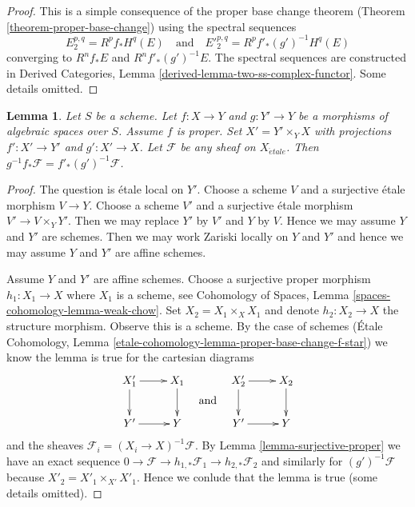 \documentclass{stacks-project}
\theoremstyle{plain}
\newtheorem{lemma}[subsection]{Lemma}
\theoremstyle{definition}
\theoremstyle{remark}
\numberwithin{equation}{subsection}
\def\etale{{\acute{e}tale}}
\begin{document}
\begin{proof}
This is a simple consequence of the proper base change theorem
(Theorem \ref{theorem-proper-base-change}) using the spectral
sequences
$$
E_2^{p, q} = R^pf_*H^q(E)
\quad\text{and}\quad
{E'}_2^{p, q} = R^pf'_*(g')^{-1}H^q(E)
$$
converging to $R^nf_*E$ and $R^nf'_*(g')^{-1}E$.
The spectral sequences are constructed in
Derived Categories, Lemma \ref{derived-lemma-two-ss-complex-functor}.
Some details omitted.
\end{proof}

\begin{lemma}
\label{lemma-proper-base-change-f-star}
Let $S$ be a scheme. Let $f : X \to Y$ and $g : Y' \to Y$
be a morphisms of algebraic spaces over $S$. Assume $f$ is proper.
Set $X' = Y' \times_Y X$ with projections $f' : X' \to Y'$ and $g' : X' \to X$.
Let $\mathcal{F}$ be any sheaf on $X_\etale$. Then
$g^{-1}f_*\mathcal{F} = f'_*(g')^{-1}\mathcal{F}$.
\end{lemma}

\begin{proof}
The question is \'etale local on $Y'$. Choose a scheme $V$ and a surjective
\'etale morphism $V \to Y$. Choose a scheme $V'$ and a surjective \'etale
morphism $V' \to V \times_Y Y'$. Then we may replace $Y'$ by $V'$ and
$Y$ by $V$. Hence we may assume $Y$ and $Y'$ are schemes.
Then we may work Zariski locally on $Y$ and $Y'$ and hence we may
assume $Y$ and $Y'$ are affine schemes.

\medskip\noindent
Assume $Y$ and $Y'$ are affine schemes. Choose a surjective proper morphism
$h_1 : X_1 \to X$ where $X_1$ is a scheme, see
Cohomology of Spaces, Lemma \ref{spaces-cohomology-lemma-weak-chow}.
Set $X_2 = X_1 \times_X X_1$ and denote
$h_2 : X_2 \to X$ the structure morphism. Observe this is a scheme.
By the case of schemes
(\'Etale Cohomology, Lemma
\ref{etale-cohomology-lemma-proper-base-change-f-star})
we know the lemma is true for the cartesian diagrams
$$
\vcenter{
\xymatrix{
X'_1 \ar[r] \ar[d] & X_1 \ar[d] \\
Y' \ar[r] & Y
}
}
\quad\text{and}\quad
\vcenter{
\xymatrix{
X'_2 \ar[r] \ar[d] & X_2 \ar[d] \\
Y' \ar[r] & Y
}
}
$$
and the sheaves $\mathcal{F}_i = (X_i \to X)^{-1}\mathcal{F}$.
By Lemma \ref{lemma-surjective-proper} we have an exact sequence
$0 \to \mathcal{F} \to h_{1, *}\mathcal{F}_1 \to h_{2, *}\mathcal{F}_2$
and similarly for $(g')^{-1}\mathcal{F}$ because
$X'_2 = X'_1 \times_{X'} X'_1$. Hence we conlude that the
lemma is true (some details omitted).
\end{proof}
\end{document}
